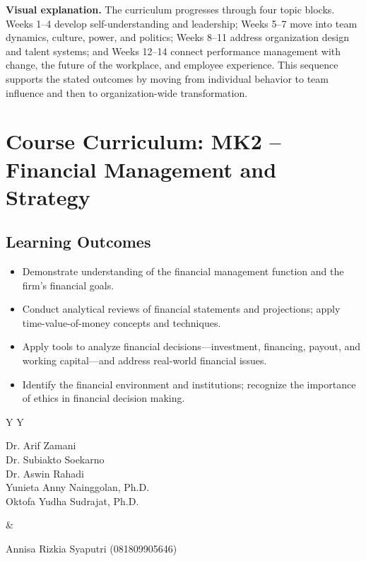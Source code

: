 \documentclass[10pt]{article}
\newcommand{\visualexplanation}[1]{%
  \begin{tcolorbox}[colback=lightgray,colframe=navy!35,boxrule=0.5pt,
    arc=2mm,left=2mm,right=2mm,top=1.5mm,bottom=1.5mm]
  \textbf{Visual explanation.} #1
  \end{tcolorbox}}
\begin{document}
\visualexplanation{The curriculum progresses through four topic blocks. Weeks 1--4 develop self-understanding and leadership; Weeks 5--7 move into team dynamics, culture, power, and politics; Weeks 8--11 address organization design and talent systems; and Weeks 12--14 connect performance management with change, the future of the workplace, and employee experience. This sequence supports the stated outcomes by moving from individual behavior to team influence and then to organization-wide transformation.}

\section{Course Curriculum: MK2 -- Financial Management and Strategy}

\subsection{Learning Outcomes}
\begin{itemize}
\item Demonstrate understanding of the financial management function and the firm's financial goals.
\item Conduct analytical reviews of financial statements and projections; apply time-value-of-money concepts and techniques.
\item Apply tools to analyze financial decisions---investment, financing, payout, and working capital---and address real-world financial issues.
\item Identify the financial environment and institutions; recognize the importance of ethics in financial decision making.
\end{itemize}

\begin{tabularx}{\textwidth}{Y Y}
\begin{tcolorbox}[colback=white,colframe=navy,title=Tim Pengajar - Dosen Pengampu,fonttitle=\bfseries]
Dr. Arif Zamani\\Dr. Subiakto Soekarno\\Dr. Aswin Rahadi\\Yunieta Anny Nainggolan, Ph.D.\\Oktofa Yudha Sudrajat, Ph.D.
\end{tcolorbox}&
\begin{tcolorbox}[colback=white,colframe=midblue,title=Asisten Mata Kuliah,fonttitle=\bfseries]
Annisa Rizkia Syaputri (081809905646)
\end{tcolorbox}
\end{tabularx}
\end{document}
